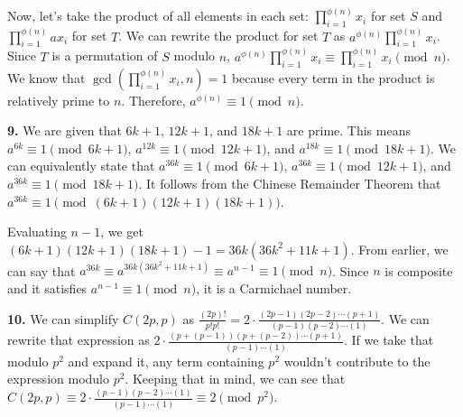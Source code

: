 \documentclass{article}
\begin{document}
Now, let's take the product of all elements in each set: $\prod_{i = 1}^{\phi(n)} x_i$ for set $S$ and $\prod_{i = 1}^{\phi(n)} ax_i$ for set $T$. We can rewrite the product for set $T$ as $a^{\phi(n)}\prod_{i = 1}^{\phi(n)} x_i$. Since $T$ is a permutation of $S$ modulo $n$, $a^{\phi(n)}\prod_{i = 1}^{\phi(n)} x_i \equiv \prod_{i = 1}^{\phi(n)} x_i \pmod{n}$. We know that $\gcd(\prod_{i = 1}^{\phi(n)} x_i, n) = 1$ because every term in the product is relatively prime to $n$. Therefore, $a^{\phi(n)} \equiv 1 \pmod{n}$.
\newline

\textbf{9.} We are given that $6k + 1$, $12k + 1$, and $18k + 1$ are prime. This means $a^{6k} \equiv 1 \pmod{6k + 1}$, $a^{12k} \equiv 1 \pmod{12k + 1}$, and $a^{18k} \equiv 1 \pmod{18k + 1}$. We can equivalently state that $a^{36k} \equiv 1 \pmod{6k + 1}$, $a^{36k} \equiv 1 \pmod{12k + 1}$, and $a^{36k} \equiv 1 \pmod{18k + 1}$. It follows from the Chinese Remainder Theorem that $a^{36k} \equiv 1 \pmod{(6k + 1)(12k + 1)(18k + 1)}$.
\newline

Evaluating $n - 1$, we get $(6k + 1)(12k + 1)(18k + 1) - 1 = 36k(36k^2 + 11k + 1)$. From earlier, we can say that $a^{36k} \equiv a^{36k(36k^2 + 11k + 1)} \equiv a^{n - 1} \equiv 1 \pmod{n}$. Since $n$ is composite and it satisfies $a^{n - 1} \equiv 1 \pmod{n}$, it is a Carmichael number.
\newline
\newline

\textbf{10.} We can simplify $C(2p, p)$ as $\frac{(2p)!}{p!p!} = 2 \cdot \frac{(2p - 1)(2p - 2)\cdots(p + 1)}{(p - 1)(p - 2)\cdots(1)}$. We can rewrite that expression as $2 \cdot \frac{(p + (p - 1))(p + (p - 2))\cdots(p + 1)}{(p - 1)\cdots(1)}$. If we take that modulo $p^2$ and expand it, any term containing $p^2$ wouldn't contribute to the expression modulo $p^2$. Keeping that in mind, we can see that $C(2p, p) \equiv 2 \cdot \frac{(p - 1)(p - 2)\cdots(1)}{(p - 1)\cdots(1)} \equiv 2 \pmod{p^2}$.
\end{document}

